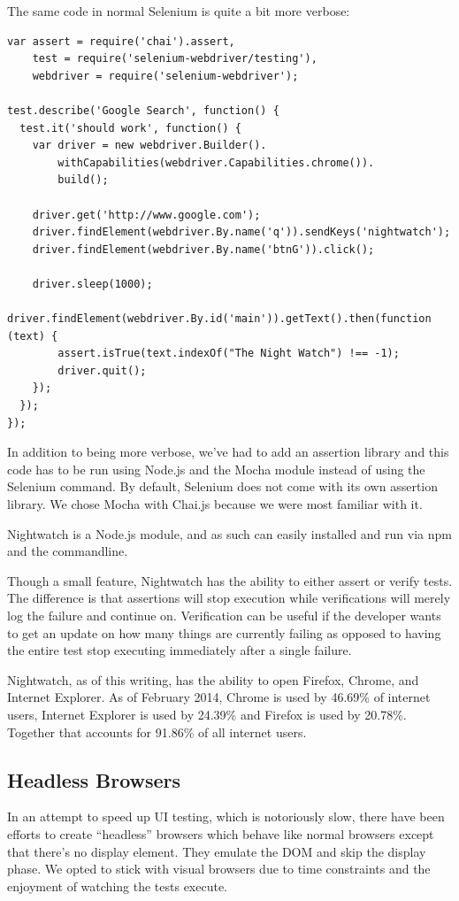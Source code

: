 \documentclass[12pt]{ucthesis}
\begin{document}
The same code in normal Selenium is quite a bit more verbose:
\begin{lstlisting}
var assert = require('chai').assert,
    test = require('selenium-webdriver/testing'),
    webdriver = require('selenium-webdriver');

test.describe('Google Search', function() {
  test.it('should work', function() {
    var driver = new webdriver.Builder().
        withCapabilities(webdriver.Capabilities.chrome()).
        build();

    driver.get('http://www.google.com');
    driver.findElement(webdriver.By.name('q')).sendKeys('nightwatch');
    driver.findElement(webdriver.By.name('btnG')).click();

    driver.sleep(1000);
    driver.findElement(webdriver.By.id('main')).getText().then(function (text) {
        assert.isTrue(text.indexOf("The Night Watch") !== -1);
        driver.quit();
    });
  });
});
\end{lstlisting}

In addition to being more verbose, we've had to add an assertion library and this code has to be run using Node.js and the Mocha module instead of using the Selenium command. By default, Selenium does not come with its own assertion library. We chose Mocha with Chai.js because we were most familiar with it.

Nightwatch is a Node.js module, and as such can easily installed and run via npm and the commandline.

Though a small feature, Nightwatch has the ability to either assert or verify tests. The difference is that assertions will stop execution while verifications will merely log the failure and continue on. Verification can be useful if the developer wants to get an update on how many things are currently failing as opposed to having the entire test stop executing immediately after a single failure.

Nightwatch, as of this writing, has the ability to open Firefox, Chrome, and Internet Explorer. As of February 2014, Chrome is used by 46.69\% of internet users, Internet Explorer is used by 24.39\% and Firefox is used by 20.78\%.\cite{BrowserStats} Together that accounts for 91.86\% of all internet users.

\subsection{Headless Browsers}
In an attempt to speed up UI testing, which is notoriously slow, there have been efforts to create ``headless'' browsers which behave like normal browsers except that there's no display element. They emulate the DOM and skip the display phase. We opted to stick with visual browsers due to time constraints and the enjoyment of watching the tests execute.
\end{document}
